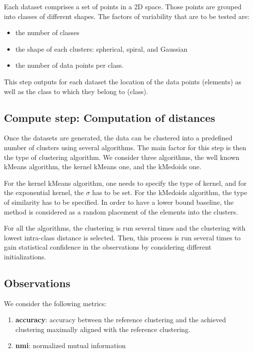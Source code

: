 \documentclass[12pt,a4paper,fleqn]{tufte-handout}
\begin{document}
Each dataset comprises a set of points in a 2D space. Those points are grouped into classes of different shapes. The factors of variability that are to be tested are:
\begin{itemize}
\item the number of classes
\item the shape of each clusters: spherical, spiral, and Gaussian
\item the number of data points per class.
\end{itemize}

This step outputs for each dataset the location of the data points (elements) as well as the class to which they belong to (class).

\subsection{\textbf{Compute step}: Computation of distances}

Once the datasets are generated, the data can be clustered into a predefined number of clusters using several algorithms. The main factor for this step is then the type of clustering algorithm. We consider three algorithms, the well known kMeans algorithm\cite{macQueenBsmsp67}, the kernel kMeans one\cite{Girolami}, and the kMedoids one\cite{Kaufman1987}.

For the kernel kMeans algorithm, one needs to specify the type of kernel, and for the exponential kernel, the $\sigma$ has to be set. For the kMedoids algorithm, the type of similarity has to be specified. In order to have a lower bound baseline, the  method is considered as a random placement of the elements into the clusters.

For all the algorithms, the clustering is run several times and the clustering with lowest intra-class distance is selected. Then, this process is run several times to gain statistical confidence in the observations by considering different initializations.

\subsection{Observations}

We consider the following metrics:
\begin{enumerate}
\item \textbf{accuracy}: accuracy between the reference clustering and the achieved clustering maximally aligned with the reference clustering.
\item \textbf{nmi}: normalized mutual information
\end{enumerate}
\end{document}
